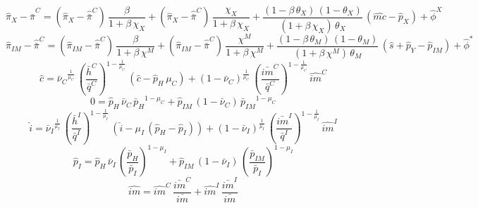 \begin{dmath}
{\hat{\pi}_{X}}-{\hat{\bar{\pi}}^C}=\left({\hat{\pi}_{X}}-{\hat{\bar{\pi}}^C}\right)\, \frac{{\beta}}{1+{\beta}\, {\chi_X}}+\left({\hat{\pi}_{X}}-{\hat{\bar{\pi}}^C}\right)\, \frac{{\chi_X}}{1+{\beta}\, {\chi_X}}+\frac{\left(1-{\beta}\, {\theta_X}\right)\, \left(1-{\theta_X}\right)}{\left(1+{\beta}\, {\chi_X}\right)\, {\theta_X}}\, \left({\hat{mc}}-{\hat{p}_X}\right)+{\hat{\phi}^X}
\end{dmath}
\begin{dmath}
{\hat{\pi}_{IM}}-{\hat{\bar{\pi}}^C}=\left({\hat{\pi}_{IM}}-{\hat{\bar{\pi}}^C}\right)\, \frac{{\beta}}{1+{\beta}\, {\chi^M}}+\left({\hat{\pi}_{IM}}-{\hat{\bar{\pi}}^C}\right)\, \frac{{\chi^M}}{1+{\beta}\, {\chi^M}}+\frac{\left(1-{\beta}\, {\theta_M}\right)\, \left(1-{\theta_M}\right)}{\left(1+{\beta}\, {\chi^M}\right)\, {\theta_M}}\, \left({\hat{s}}+{\hat{p}_Y}-{\hat{p}_{IM}}\right)+{\hat{\phi}^*}
\end{dmath}
\begin{dmath}
{\hat{c}}={\bar{\nu}_C}^{\frac{1}{{\mu_C}}}\, \left(\frac{{\bar{h}^C}}{{\bar{q}^C}}\right)^{1-\frac{1}{{\mu_C}}}\, \left({\hat{c}}-{\hat{p}_H}\, {\mu_C}\right)+\left(1-{\bar{\nu}_C}\right)^{\frac{1}{{\mu_C}}}\, \left(\frac{{\bar{im}^C}}{{\bar{q}^C}}\right)^{1-\frac{1}{{\mu_C}}}\, {\hat{im}^C}
\end{dmath}
\begin{dmath}
0={\hat{p}_H}\, {\bar{\nu}_C}\, {\bar{p}_H}^{1-{\mu_C}}+{\hat{p}_{IM}}\, \left(1-{\bar{\nu}_C}\right)\, {\bar{p}_{IM}}^{1-{\mu_C}}
\end{dmath}
\begin{dmath}
{\hat{i}}={\bar{\nu}_I}^{\frac{1}{{\mu_I}}}\, \left(\frac{{\bar{h}^I}}{{\bar{q}^I}}\right)^{1-\frac{1}{{\mu_I}}}\, \left({\hat{i}}-{\mu_I}\, \left({\hat{p}_H}-{\hat{p}_I}\right)\right)+\left(1-{\bar{\nu}_I}\right)^{\frac{1}{{\mu_I}}}\, \left(\frac{{\bar{im}^I}}{{\bar{q}^I}}\right)^{1-\frac{1}{{\mu_I}}}\, {\hat{im}^I}
\end{dmath}
\begin{dmath}
{\hat{p}_I}={\hat{p}_H}\, {\bar{\nu}_I}\, \left(\frac{{\bar{p}_H}}{{\bar{p}_I}}\right)^{1-{\mu_I}}+{\hat{p}_{IM}}\, \left(1-{\bar{\nu}_I}\right)\, \left(\frac{{\bar{p}_{IM}}}{{\bar{p}_I}}\right)^{1-{\mu_I}}
\end{dmath}
\begin{dmath}
{\hat{im}}={\hat{im}^C}\, \frac{{\bar{im}^C}}{{\bar{im}}}+{\hat{im}^I}\, \frac{{\bar{im}^I}}{{\bar{im}}}
\end{dmath}
